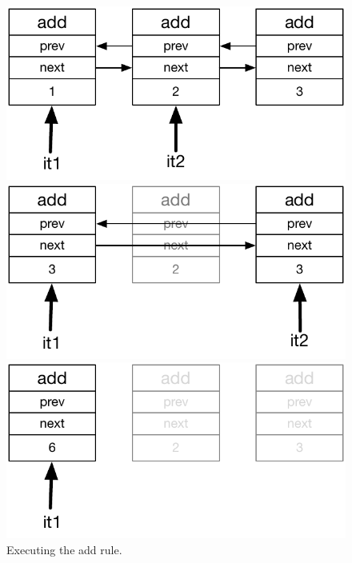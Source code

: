 \begin{figure}
\centering
\begin{minipage}{.40\textwidth}
  \centering
  \includegraphics[width=.9\linewidth]{figures/update}
\end{minipage}\hspace{0.5cm}
\begin{minipage}{.40\textwidth}
  \centering
  \includegraphics[width=0.9\linewidth]{figures/update2}
\end{minipage}
\begin{minipage}{.40\textwidth}
   \centering
  \includegraphics[width=0.9\linewidth]{figures/update3}
\end{minipage}
\caption{Executing the add rule.}
\label{fig:update_add}
\end{figure}

